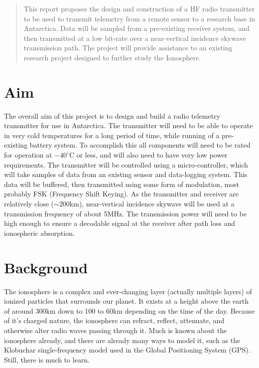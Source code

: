 \documentclass[a4paper,12pt]{article}
\begin{document}
\newpage
 \thispagestyle{empty}
 \vspace*{\fill}
 \begin{abstract}
 \noindent
This report proposes the design and construction of a HF radio transmitter to be used to transmit telemetry from a remote sensor to a research base in Antarctica. Data will be sampled from a pre-existing receiver system, and then transmitted at a low bit-rate over a near-vertical incidence skywave transmission path. The project will provide assistance to an existing research project designed to further study the Ionosphere.

 \end{abstract}
 \vspace*{\fill}
\newpage
\thispagestyle{empty}
 \tableofcontents
 
 \newpage
\section{Aim}
The overall aim of this project is to design and build a radio telemetry transmitter for use in Antarctica. The transmitter will need to be able to operate in very cold temperatures for a long period of time, while running of a pre-existing battery system. To accomplish this all components will need to be rated for operation at $-40^\circ$C or less, and will also need to have very low power requirements.
The transmitter will be controlled using a micro-controller, which will take samples of data from an existing sensor and data-logging system. This data will be buffered, then transmitted using some form of modulation, most probably FSK (Frequency Shift Keying). As the transmitter and receiver are relatively close ($\sim$200km), near-vertical incidence skywave will be used at a transmission frequency of about 5MHz. The transmission power will need to be high enough to ensure a decodable signal at the receiver after path loss and ionospheric absorption.

\section{Background}
The ionosphere is a complex and ever-changing layer (actually multiple layers) of ionized particles that surrounds our planet. It exists at a height above the earth of around 300km down to 100 to 60km depending on the time of the day. Because of it's charged nature, the ionosphere can refract, reflect, attenuate, and otherwise alter radio waves passing through it. Much is known about the ionosphere already, and there are already many ways to model it, such as the Klobuchar single-frequency model used in the Global Positioning System (GPS). Still, there is much to learn.
\end{document}
